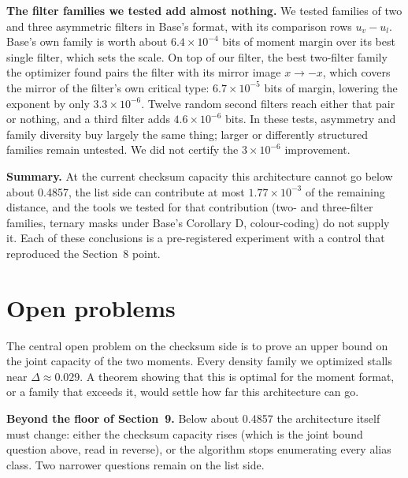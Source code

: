 \documentclass[11pt]{article}
\theoremstyle{plain}
\begin{document}
\textbf{The filter families we tested add almost nothing.} We tested families of two and three asymmetric filters in Base's format, with its comparison rows $u_v - u_l$. Base's own family is worth about $6.4\times10^{-4}$ bits of moment margin over its best single filter, which sets the scale. On top of our filter, the best two-filter family the optimizer found pairs the filter with its mirror image $x \to -x$, which covers the mirror of the filter's own critical type: $6.7\times10^{-5}$ bits of margin, lowering the exponent by only $3.3\times10^{-6}$. Twelve random second filters reach either that pair or nothing, and a third filter adds $4.6\times10^{-6}$ bits. In these tests, asymmetry and family diversity buy largely the same thing; larger or differently structured families remain untested. We did not certify the $3\times10^{-6}$ improvement.

\textbf{Summary.} At the current checksum capacity this architecture cannot go below about 0.4857, the list side can contribute at most $1.77\times10^{-3}$ of the remaining distance, and the tools we tested for that contribution (two- and three-filter families, ternary masks under Base's Corollary D, colour-coding) do not supply it. Each of these conclusions is a pre-registered experiment with a control that reproduced the Section~8 point.

\section{Open problems}

The central open problem on the checksum side is to prove an upper bound on the joint capacity of the two moments. Every density family we optimized stalls near $\Delta \approx 0.029$. A theorem showing that this is optimal for the moment format, or a family that exceeds it, would settle how far this architecture can go.

\textbf{Beyond the floor of Section~9.} Below about 0.4857 the architecture itself must change: either the checksum capacity rises (which is the joint bound question above, read in reverse), or the algorithm stops enumerating every alias class. Two narrower questions remain on the list side.
\end{document}
